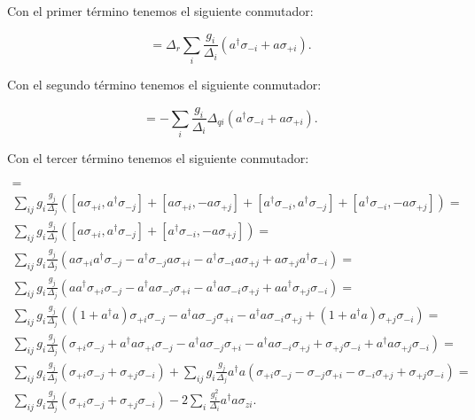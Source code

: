 Con el primer término tenemos el siguiente conmutador:

\begin{equation}
    [\Delta_r a^\dagger a, \sum\limits_i \frac{g_i} {\Delta_i} (a^\dagger \sigma_{-i} - a \sigma_{+i})] = \Delta_r \sum\limits_i \frac{g_i} {\Delta_i} (a^\dagger \sigma_{-i} + a \sigma_{+i}) .
\end{equation}

Con el segundo término tenemos el siguiente conmutador:

\begin{equation}
    [- \frac{1}{2} \sum\limits_i \Delta_{qi} \sigma_{zi}, \sum\limits_i \frac{g_i} {\Delta_i} (a^\dagger \sigma_{-i} - a \sigma_{+i})] = - \sum\limits_i \frac{g_i} {\Delta_i} \Delta_{qi} (a^\dagger \sigma_{-i} + a \sigma_{+i}) .
\end{equation}

Con el tercer término tenemos el siguiente conmutador:

\begin{multline}
[\sum\limits_i g_i (a \sigma_{+i} + a^\dagger \sigma_{-i}), \sum\limits_j \frac{g_j} {\Delta_j} (a^\dagger \sigma_{-j} - a \sigma_{+j})] = \\
\sum\limits_{ij} g_i \frac{g_j}{\Delta_j} \left([ a \sigma_{+i}, a^\dagger \sigma_{-j}] +
[a \sigma_{+i}, - a \sigma_{+j}] +
[a^\dagger \sigma_{-i}, a^\dagger \sigma_{-j}] +
[a^\dagger \sigma_{-i}, - a \sigma_{+j}]\right) =\\
\sum\limits_{ij} g_i \frac{g_j}{\Delta_j} \left([ a \sigma_{+i}, a^\dagger \sigma_{-j}] +
[a^\dagger \sigma_{-i}, - a \sigma_{+j}]\right) =\\
\sum\limits_{ij} g_i \frac{g_j}{\Delta_j} \left(
    a \sigma_{+i} a^\dagger \sigma_{-j} - a^\dagger \sigma_{-j} a \sigma_{+i}
    - a^\dagger \sigma_{-i} a \sigma_{+j} + a \sigma_{+j} a^\dagger \sigma_{-i}\right) =\\
\sum\limits_{ij} g_i \frac{g_j}{\Delta_j} \left(
    a a^\dagger \sigma_{+i} \sigma_{-j} - a^\dagger a \sigma_{-j} \sigma_{+i}
    - a^\dagger a \sigma_{-i} \sigma_{+j} + a a^\dagger \sigma_{+j} \sigma_{-i}\right) =\\
\sum\limits_{ij} g_i \frac{g_j}{\Delta_j} \left(
    (1 + a^\dagger a) \sigma_{+i} \sigma_{-j} - a^\dagger a \sigma_{-j} \sigma_{+i}
    - a^\dagger a \sigma_{-i} \sigma_{+j} + (1 + a^\dagger a) \sigma_{+j} \sigma_{-i}\right) =\\
\sum\limits_{ij} g_i \frac{g_j}{\Delta_j} \left(
    \sigma_{+i} \sigma_{-j} + a^\dagger a \sigma_{+i} \sigma_{-j} - a^\dagger a \sigma_{-j} \sigma_{+i}
    - a^\dagger a \sigma_{-i} \sigma_{+j} + \sigma_{+j} \sigma_{-i} + a^\dagger a \sigma_{+j} \sigma_{-i}\right) =\\
\sum\limits_{ij} g_i \frac{g_j}{\Delta_j} \left(\sigma_{+i} \sigma_{-j} + \sigma_{+j} \sigma_{-i}\right) +
\sum\limits_{ij} g_i \frac{g_j}{\Delta_j} a^\dagger a \left(
    \sigma_{+i} \sigma_{-j} - \sigma_{-j} \sigma_{+i}
    - \sigma_{-i} \sigma_{+j} + \sigma_{+j} \sigma_{-i}\right) =\\
\sum\limits_{ij} g_i \frac{g_j}{\Delta_j} \left(\sigma_{+i} \sigma_{-j} + \sigma_{+j} \sigma_{-i}\right) -
2 \sum\limits_{i} \frac{g_i^2}{\Delta_i} a^\dagger a \sigma_{zi} .
\end{multline}

